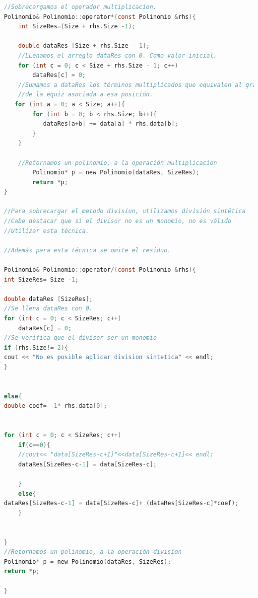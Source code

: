 \documentclass[11pt]{article}
\begin{document}
\begin{lstlisting}[language=C]
//Sobrecargamos el operador multiplicacion.
Polinomio& Polinomio::operator*(const Polinomio &rhs){
    int SizeRes=(Size + rhs.Size -1);

    double dataRes [Size + rhs.Size - 1]; 
	//LLenamos el arreglo dataRes con 0. Como valor inicial.
    for (int c = 0; c < Size + rhs.Size - 1; c++)
        dataRes[c] = 0;
	//Sumamos a dataRes los términos multiplicados que equivalen al grado
	//de la equiz asociada a esa posición. 
   for (int a = 0; a < Size; a++){
        for (int b = 0; b < rhs.Size; b++){
           dataRes[a+b] += data[a] * rhs.data[b];  
        }
    }

	//Retornamos un polinomio, a la operación multiplicacion
    	Polinomio* p = new Polinomio(dataRes, SizeRes);  
        return *p;
}

//Para sobrecargar el metodo division, utilizamos división sintética
//Cabe destacar que si el divisor no es un monomio, no es válido 
//Utilizar esta técnica.

//Además para esta técnica se omite el residuo.

Polinomio& Polinomio::operator/(const Polinomio &rhs){
int SizeRes= Size -1;

double dataRes [SizeRes]; 
//Se llena dataRes con 0.
for (int c = 0; c < SizeRes; c++)
	dataRes[c] = 0;
//Se verifica que el divisor ser un monomio
if (rhs.Size!= 2){
cout << "No es posible aplicar division sintetica" << endl;
}


else{
double coef= -1* rhs.data[0];


for (int c = 0; c < SizeRes; c++)
	if(c==0){
	//cout<< "data[SizeRes-c+1]"<<data[SizeRes-c+1]<< endl;
	dataRes[SizeRes-c-1] = data[SizeRes-c];
	
	}
	else{
dataRes[SizeRes-c-1] = data[SizeRes-c]+ (dataRes[SizeRes-c]*coef);
	}


}
//Retornamos un polinomio, a la operación division
Polinomio* p = new Polinomio(dataRes, SizeRes);  
return *p;

}



\end{lstlisting}
\end{document}
